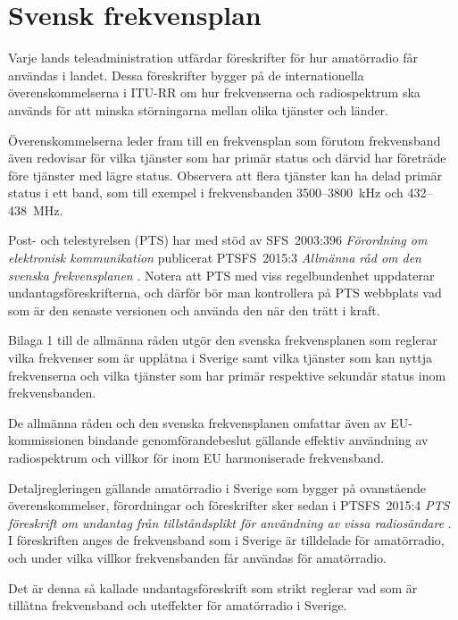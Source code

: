 \chapter{Svensk frekvensplan}
\label{svensk frekvensplan}

Varje lands teleadministration utfärdar föreskrifter för hur amatörradio får
användas i landet.
Dessa föreskrifter bygger på de internationella överenskommelserna i ITU-RR
\cite[ARTICLE 5]{ITU-RR} om hur frekvenserna och radiospektrum ska används för
att minska störningarna mellan olika tjänster och länder.

Överenskommelserna leder fram till en frekvensplan som förutom frekvensband även
redovisar för vilka tjänster som har primär status och därvid har företräde före
tjänster med lägre status.
Observera att flera tjänster kan ha delad primär status i ett band, som till
exempel i frekvensbanden 3500--3800~kHz och 432--438~MHz.

Post- och telestyrelsen (PTS) har med stöd av SFS~2003:396
\emph{Förordning om elektronisk kommunikation} \cite{SFS2003:396}
publicerat PTSFS~2015:3 \emph{Allmänna råd om den svenska frekvensplanen}
\cite{PTSFS2015:3}.
Notera att PTS med viss regelbundenhet uppdaterar undantagsföreskrifterna,
och därför bör man kontrollera på PTS webbplats vad som är den senaste versionen
och använda den när den trätt i kraft.

Bilaga 1 till de allmänna råden utgör den svenska frekvensplanen som reglerar
vilka frekvenser som är upplåtna i Sverige samt vilka tjänster som kan nyttja
frekvenserna och vilka tjänster som har primär respektive sekundär status inom
frekvensbanden.

De allmänna råden och den svenska frekvensplanen omfattar även av
EU-kommissionen bindande genomförandebeslut gällande effektiv användning av
radiospektrum och villkor för inom EU harmoniserade frekvensband.

Detaljregleringen gällande amatörradio i Sverige som bygger på ovanstående
överenskommelser, förordningar och föreskrifter sker sedan i PTSFS~2015:4
\emph{PTS föreskrift om undantag från tillståndsplikt för användning av vissa
  radiosändare} \cite{PTSFS2015:4}.
I föreskriften anges de frekvensband som i Sverige är tilldelade för
amatörradio, och under vilka villkor frekvensbanden får användas för
amatörradio.

Det är denna så kallade undantagsföreskrift som strikt reglerar vad som är
tillåtna frekvensband och uteffekter för amatörradio i Sverige.


